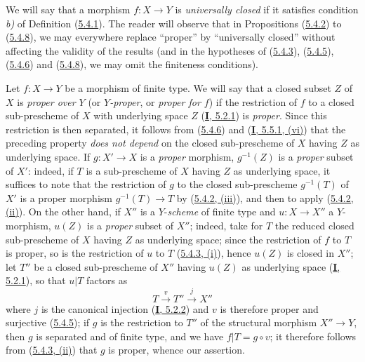 \begin{remark}[5.4.9]
\label{II.5.4.9}
We will say that a morphism $f:X\to Y$ is \emph{universally closed} if it
satisfies condition \emph{b)} of Definition
(\hyperref[II.5.4.1]{5.4.1}). The reader will observe that
in Propositions (\hyperref[II.5.4.2]{5.4.2}) to
(\hyperref[II.5.4.8]{5.4.8}), we may everywhere replace ``proper'' by
``universally closed'' without affecting the validity of the results (and in
the hypotheses of (\hyperref[II.5.4.3]{5.4.3}),
(\hyperref[II.5.4.5]{5.4.5}), (\hyperref[II.5.4.6]{5.4.6}) and
(\hyperref[II.5.4.8]{5.4.8}), we may omit the finiteness
conditions).
\end{remark}

\begin{env}[5.4.10]
\label{II.5.4.10}
Let $f:X\to Y$ be a morphism of finite type. We will say that a closed subset
$Z$ of $X$ is \emph{proper over $Y$} (or \emph{$Y$-proper}, or \emph{proper
for $f$}) if the restriction of $f$ to a closed sub-prescheme of $X$
with underlying space $Z$ (\hyperref[I.5.2.1]{\textbf{I}, 5.2.1}) is \emph{proper}.
Since this restriction is then separated, it follows from
(\hyperref[II.5.4.6]{5.4.6}) and (\hyperref[I.5.5.1]{\textbf{I}, 5.5.1, (vi)})
that the preceding property \emph{does not depend} on the closed sub-prescheme of
$X$ having $Z$ as underlying space. If $g:X'\to X$ is a \emph{proper} morphism,
$g^{-1}(Z)$ is a \emph{proper} subset of $X'$: indeed, if $T$ is a sub-prescheme of
$X$ having $Z$ as underlying space, it suffices to note that the
restriction of $g$ to the closed sub-prescheme $g^{-1}(T)$ of $X'$ is a
proper morphism $g^{-1}(T)\to T$ by
(\hyperref[II.5.4.2]{5.4.2, (iii)}), and then to apply
(\hyperref[II.5.4.2]{5.4.2, (ii)}). On the other hand, if $X''$ is a
$Y$-\emph{scheme} of finite type and $u:X\to X''$ a $Y$-morphism, $u(Z)$ is a
\emph{proper} subset of $X''$; indeed, take for $T$ the reduced closed
sub-prescheme of $X$ having $Z$ as underlying space; since the restriction
of $f$ to $T$ is proper, so is the restriction of $u$ to $T$
(\hyperref[II.5.4.3]{5.4.3, (i)}), hence $u(Z)$ is closed in $X''$;
let $T''$ be a closed sub-prescheme of $X''$ having $u(Z)$ as underlying
space (\hyperref[I.5.2.1]{\textbf{I}, 5.2.1}), so that $u|T$ factors as
\[
  T\xrightarrow{v}T''\xrightarrow{j}X''
\]
where $j$ is the canonical injection (\hyperref[I.5.2.2]{\textbf{I}, 5.2.2}) and $v$
is therefore proper and surjective (\hyperref[II.5.4.5]{5.4.5}); if $g$ is
the restriction to $T''$ of the structural morphism $X''\to Y$, then $g$ is
separated and of finite type, and we have $f|T=g\circ v$; it therefore
follows from (\hyperref[II.5.4.3]{5.4.3, (ii)}) that $g$ is proper, whence
our assertion.
\end{env}

